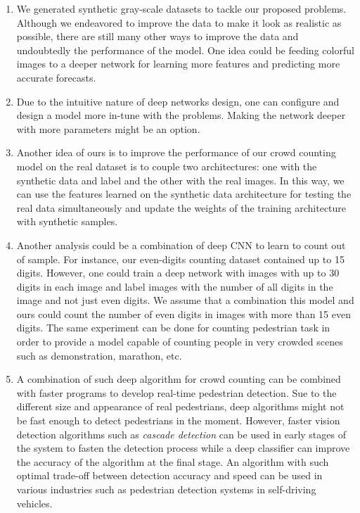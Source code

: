 \begin{enumerate}

	\item We generated synthetic gray-scale datasets to tackle our proposed problems. Although we endeavored to improve the data to make it look as realistic as possible, there are still many other ways to improve the data and undoubtedly the performance of the model. One idea could be feeding colorful images to a deeper network for learning more features and predicting more accurate forecasts.   
	
	\item Due to the intuitive nature of deep networks design, one can configure and design a model more in-tune with the problems. Making the network deeper with more parameters might be an option.
	
	\item Another idea of ours is to improve the performance of our crowd counting model on the real dataset is to couple two architectures: one with the synthetic data and label and the other with the real images. In this way, we can use the features learned on the synthetic data architecture for testing the real data simultaneously and update the weights of the training architecture with synthetic samples. 
	
	\item Another analysis could be a combination of deep CNN to learn to count out of sample. For instance, our even-digits counting dataset contained up to 15 digits. However, one could train a deep network with images with up to 30 digits in each image and label images with the number of all digits in the image and not just even digits. We assume that a combination this model and ours could count the number of even digits in images with more than 15 even digits. The same experiment can be done for counting pedestrian task in order to provide a model capable of counting people in very crowded scenes such as demonstration, marathon, etc. 
	
	\item A combination of such deep algorithm for crowd counting can be combined with faster programs to develop real-time pedestrian detection. Sue to the different size and appearance of real pedestrians, deep algorithms might not be fast enough to detect pedestrians in the moment. However, faster vision detection algorithms such as \textit{cascade detection} can be used in early stages of the system to fasten the detection  process while a deep classifier can improve the accuracy of the algorithm at the final stage. An algorithm with such optimal trade-off between detection accuracy and speed can be used in various industries such as pedestrian detection systems in self-driving vehicles. 
\end{enumerate}  


